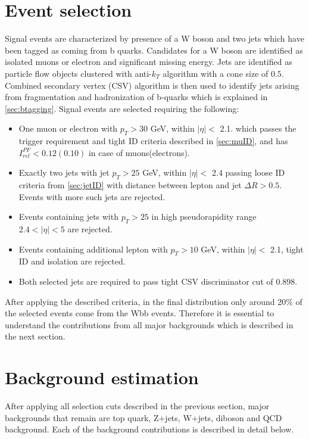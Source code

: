 
\section{Event selection}
\label{sec:selection}
Signal events are characterized by presence of a W boson and two jets which have been tagged as coming from b quarks. 
Candidates for a W boson are identified as isolated muons or electron and significant missing energy. 
Jets are identified as particle flow objects clustered with anti-$k_T$ algorithm with a cone size of $0.5$.
Combined secondary vertex (CSV) algorithm is then used to identify jets arising from fragmentation and hadronization of b-quarks which is explained in \ref{sec:btagging}. Signal events are selected requiring the following:
\begin{itemize}
\item One muon or electron with $p_T>30$ GeV, within $|\eta|<$ 2.1. which passes the trigger requirement and tight ID criteria described in \ref{sec:muID}, and has $I_{rel}^{PF}<0.12(0.10)$ in case of muons(electrons).
\item Exactly two jets with jet $p_T>25$ GeV, within $|\eta|<$ 2.4 passing loose ID criteria from \ref{sec:jetID} with distance between lepton and jet $\Delta R>0.5$. Events with more such jets are rejected.
\item Events containing jets with $p_T>25$ in high pseudorapidity range $2.4<|\eta|<5$ are rejected.
\item Events containing additional lepton with $p_T>10$ GeV, within $|\eta|<$ 2.1, tight ID and isolation are rejected.
\item Both selected jets are required to pass tight CSV discriminator cut of 0.898.
\end{itemize} 

After applying the described criteria, in the final distribution only around 20$\%$ of the selected events come from the Wbb events. Therefore it is essential to understand the contributions from all major backgrounds which is described in the next section. 

\section{Background estimation}
\label{sec:background}
After applying all selection cuts described in the previous section, major backgrounds that remain are top quark, Z+jets, W+jets, diboson and QCD background. Each of the background contributions is described in detail below. 

